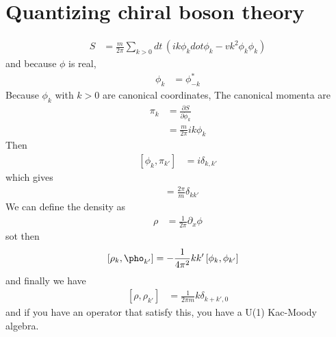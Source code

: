 \section{Quantizing chiral boson theory}
\begin{align}
    S &=
    \frac{m}{2\pi}
    \sum_{k>0}
    dt\,
    \left( 
    ik \phi_k dot{\phi}_k
    - vk^2 \phi_k\phi_k
    \right)
\end{align}
and because $\phi$ is real,
\begin{align}
    \phi_k &= \phi_{-k}^{*}
\end{align}
Because $\phi_k$ with $k>0$ are canonical coordinates,
The canonical momenta are
\begin{align}
    \pi_k &=
    \frac{\partial S}{\partial \dot{\phi}_k}\\
    &= \frac{m}{2\pi} ik \phi_{k}
\end{align}
Then
\begin{align}
    \left[ \phi_k, \pi_{k'} \right]
    &=
    i\delta_{k, k'}
\end{align}
which gives
\begin{align}
    [\phi_k, k'\phi_{k'}]
    &=
    \frac{2\pi}{m}\delta_{kk'}
\end{align}
We can define the density as
\begin{align}
    \rho &=
    \frac{1}{2\pi} \partial_x \phi
\end{align}
sot then
\begin{align}
    \left[ \rho_k, \pho_{k'} \right]
    &=
    -\frac{1}{4\pi^2} kk' \left[ \phi_k, \phi_{k'} \right]
\end{align}
and finally we have
\begin{align}
    \left[ \rho, \rho_{k'} \right]
    &=
    \frac{1}{2\pi m} k \delta_{k+k',0}
\end{align}
and if you have an operator that satisfy this,
you have a U(1) Kac-Moody algebra.

